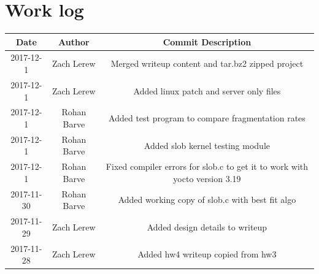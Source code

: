 \documentclass[onecolumn, draftclsnofoot,10pt, compsoc]{IEEEtran}
\begin{document}
  \section*{Work log}
    \begin{center}
      \begin{tabular}{ |c|c|c| }
        \hline
        Date & Author & Commit Description \\
        \hline
        2017-12-1 & Zach Lerew & Merged writeup content and tar.bz2 zipped project \\
        2017-12-1 & Zach Lerew & Added linux patch and server only files \\
        2017-12-1 & Rohan Barve & Added test program to compare fragmentation rates \\
        2017-12-1 & Rohan Barve & Added slob kernel testing module \\
        2017-12-1 & Rohan Barve & Fixed compiler errors for slob.c to get it to work with yocto version 3.19 \\
        2017-11-30 & Rohan Barve & Added working copy of slob.c with best fit algo \\
        2017-11-29 & Zach Lerew & Added design details to writeup \\
        2017-11-28 & Zach Lerew & Added hw4 writeup copied from hw3 \\
        \hline
      \end{tabular}
    \end{center}


  
  
\end{document}
